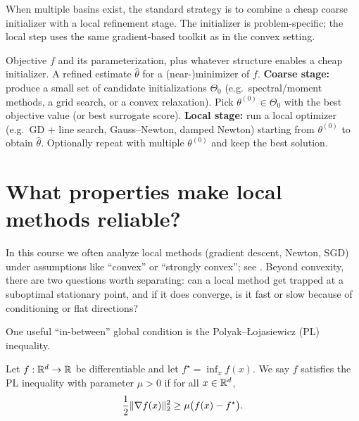 \documentclass[11pt]{article}
\begin{document}
When multiple basins exist, the standard strategy is to combine a cheap coarse initializer with a local refinement stage.
The initializer is problem-specific; the local step uses the same gradient-based toolkit as in the convex setting.
\begin{algorithm}[H]
  \caption{Two-stage template: coarse initialization + local refinement}
  \label{alg:two-stage-template}
  \begin{algorithmic}[1]
    \Require Objective $f$ and its parameterization, plus whatever structure enables a cheap initializer.
    \Ensure A refined estimate $\hat\theta$ for a (near-)minimizer of $f$.
    \State \textbf{Coarse stage:} produce a small set of candidate initializations $\Theta_0$ (e.g.\ spectral/moment methods, a grid search, or a convex relaxation).
    \State Pick $\theta^{(0)}\in\Theta_0$ with the best objective value (or best surrogate score).
    \State \textbf{Local stage:} run a local optimizer (e.g.\ GD + line search, Gauss--Newton, damped Newton) starting from $\theta^{(0)}$ to obtain $\hat\theta$.
    \State Optionally repeat with multiple $\theta^{(0)}$ and keep the best solution.
  \end{algorithmic}
\end{algorithm}

\section[Optimization hierarchy]{What properties make local methods reliable?}
\label{sec:optimization-hierarchy}

In this course we often analyze local methods (gradient descent, Newton, SGD) under assumptions like ``convex'' or ``strongly convex''; see \citep[\S9.2--9.3]{boyd_vandenberghe_2004_convex}.
Beyond convexity, there are two questions worth separating: can a local method get trapped at a suboptimal stationary point, and if it does converge, is it fast or slow because of conditioning or flat directions?

One useful ``in-between'' global condition is the Polyak--\L{}ojasiewicz (PL) inequality.
\begin{definition}
\label{def:pl-inequality}
Let $f:\mathbb{R}^d\to\mathbb{R}$ be differentiable and let $f^\star=\inf_x f(x)$.
We say $f$ satisfies the PL inequality with parameter $\mu>0$ if for all $x\in\mathbb{R}^d$,
\[
\frac{1}{2}\lVert\nabla f(x)\rVert_2^2 \ge \mu\bigl(f(x)-f^\star\bigr).
\]
\end{definition}
\end{document}
